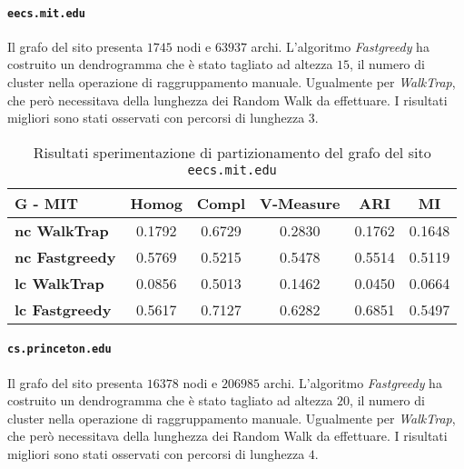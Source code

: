 \paragraph{\texttt{eecs.mit.edu}} Il grafo del sito presenta $1745$ nodi e $63937$ archi. L'algoritmo \textit{Fastgreedy} ha costruito un dendrogramma che è stato tagliato ad altezza $15$, il numero di cluster nella operazione di raggruppamento manuale. Ugualmente per \textit{WalkTrap}, che però necessitava della lunghezza dei Random Walk da effettuare. I risultati migliori sono stati osservati con percorsi di lunghezza $3$.

\begin{table}[H]
	\begin{tabular}{| l | c | c | c | c | c |}
	\hline
	\textbf{G - MIT}  & \textbf{Homog} & \textbf{Compl} & \textbf{V-Measure}  & \textbf{ARI}  & \textbf{MI} \\ [3ex] \hline
	\textbf{nc WalkTrap} & 0.1792 & 0.6729 & 0.2830 & 0.1762 & 0.1648\\ [3ex]
	 \hline
	\textbf{nc Fastgreedy} & 0.5769 & 0.5215 & 0.5478 & 0.5514 & 0.5119\\ [3ex]
	 \hline	
	\textbf{lc WalkTrap} & 0.0856 & 0.5013 & 0.1462 & 0.0450 & 0.0664\\ [3ex]
	 \hline	
	\textbf{lc Fastgreedy} & 0.5617 & 0.7127 & 0.6282 & 0.6851 & 0.5497\\ [3ex]
	\hline
	\end{tabular}
	\caption{Risultati sperimentazione di partizionamento del grafo del sito \texttt{eecs.mit.edu}}
	\label{metricheGraphMit}
\end{table}

\paragraph{\texttt{cs.princeton.edu}} Il grafo del sito presenta $16378$ nodi e $206985$ archi. L'algoritmo \textit{Fastgreedy} ha costruito un dendrogramma che è stato tagliato ad altezza $20$, il numero di cluster nella operazione di raggruppamento manuale. Ugualmente per \textit{WalkTrap}, che però necessitava della lunghezza dei Random Walk da effettuare. I risultati migliori sono stati osservati con percorsi di lunghezza $4$.

